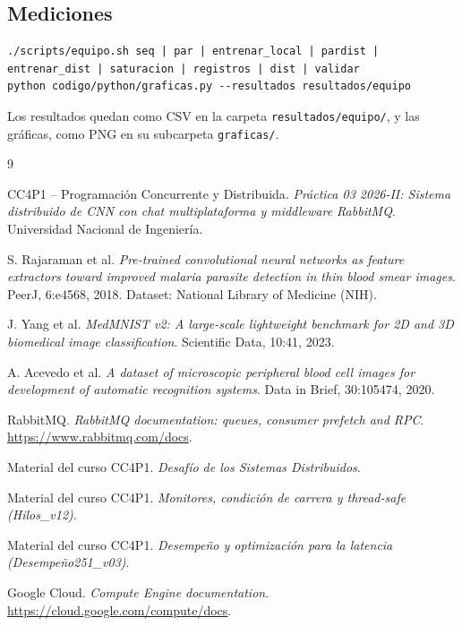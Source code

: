 \documentclass[10pt,a4paper]{article}
\begin{document}
\subsection*{Mediciones}

\begin{lstlisting}[language={},numbers=none]
./scripts/equipo.sh seq | par | entrenar_local | pardist | entrenar_dist | saturacion | registros | dist | validar
python codigo/python/graficas.py --resultados resultados/equipo
\end{lstlisting}

Los resultados quedan como CSV en la carpeta \texttt{resultados/equipo/}, y las gráficas, como PNG
en su subcarpeta \texttt{graficas/}.

\newpage
\begin{thebibliography}{9}

CC4P1 -- Programación Concurrente y Distribuida.
\textit{Práctica 03 2026-II: Sistema distribuido de CNN con chat multiplataforma y middleware RabbitMQ}.
Universidad Nacional de Ingeniería.

S. Rajaraman et al.
\textit{Pre-trained convolutional neural networks as feature extractors toward improved malaria parasite detection in thin blood smear images}.
PeerJ, 6:e4568, 2018. Dataset: National Library of Medicine (NIH).

J. Yang et al.
\textit{MedMNIST v2: A large-scale lightweight benchmark for 2D and 3D biomedical image classification}.
Scientific Data, 10:41, 2023.

A. Acevedo et al.
\textit{A dataset of microscopic peripheral blood cell images for development of automatic recognition systems}.
Data in Brief, 30:105474, 2020.

RabbitMQ.
\textit{RabbitMQ documentation: queues, consumer prefetch and RPC}.
\url{https://www.rabbitmq.com/docs}.

Material del curso CC4P1.
\textit{Desafío de los Sistemas Distribuidos}.

Material del curso CC4P1.
\textit{Monitores, condición de carrera y thread-safe (Hilos\_v12)}.

Material del curso CC4P1.
\textit{Desempeño y optimización para la latencia (Desempeño251\_v03)}.

Google Cloud.
\textit{Compute Engine documentation}.
\url{https://cloud.google.com/compute/docs}.

\end{thebibliography}
\end{document}

